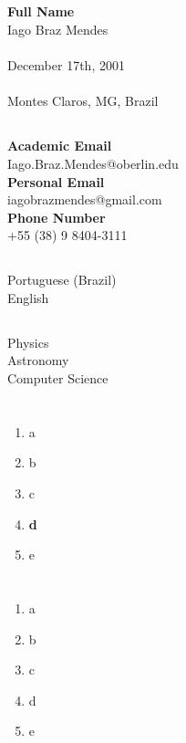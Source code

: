 \documentclass{cv}
\begin{document}
    \firstsection
        {
            \subsection*{}
                \textbf{Full Name} \\ Iago Braz Mendes \\
                \faCalendar \\ December 17th, 2001 \\
                \faHome \\ Montes Claros, MG, Brazil
        }
        {
            \subsection*{}
                \textbf{Academic Email} \\ {\footnotesize Iago.Braz.Mendes@oberlin.edu} \\
                \textbf{Personal Email} \\ {\footnotesize iagobrazmendes@gmail.com} \\
                \textbf{Phone Number} \\ +55 (38) 9 8404-3111
        }
        {
            \subsection*{}
                Portuguese (Brazil) \\ English
        }
        {
            \subsection*{}
                Physics \\ Astronomy \\ Computer Science
        }
    \section*{}
        \begin{enumerate}
            \item a
            \item b
            \item c
            \item \textbf{d}
            \item e
        \end{enumerate}
    \section*{}
        \begin{enumerate}
            \item a
            \item b
            \item c
            \item d
            \item e
        \end{enumerate}
\end{document}
